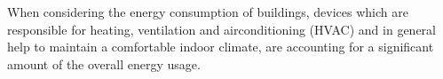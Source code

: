 %
When considering the energy consumption of buildings, devices which are responsible for
heating, ventilation and airconditioning (HVAC) and in general help to maintain a comfortable indoor climate,
are accounting for a significant amount of the overall energy usage. 

